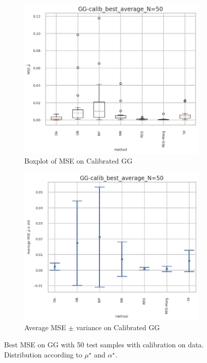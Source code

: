 \begin{figure}[ht!]
  \begin{subfigure}[t]{0.49\linewidth}
    \includegraphics[width=\linewidth]{COMPARE/GG-calib/BEST_MSE/GG-calib_best_average_N=50-boxplot_mse.png}
    \caption{Boxplot of MSE on Calibrated GG}
  \end{subfigure}%
  \hfill
  \begin{subfigure}[t]{0.49\linewidth}
    \includegraphics[width=\linewidth]{COMPARE/GG-calib/BEST_MSE/GG-calib_best_average_N=50-errplot_mse.png}
    \caption{Average MSE $\pm$ variance on Calibrated GG}
  \end{subfigure}

  \caption{Best MSE on GG with 50 test samples with calibration on data. Distribution according to $\mu^\star$ and $\alpha^\star$.}
  \label{fig:compare_gg_best_mse50_samples}
\end{figure}


